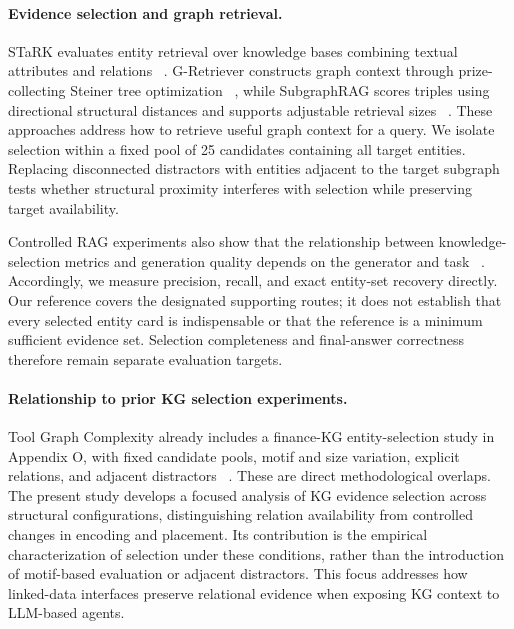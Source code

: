 \paragraph{Evidence selection and graph retrieval.}
STaRK evaluates entity retrieval over knowledge bases combining textual attributes and relations ~\cite{wu2024stark}. G-Retriever constructs graph context through prize-collecting Steiner tree optimization ~\cite{he2024gretriever}, while SubgraphRAG scores triples using directional structural distances and supports adjustable retrieval sizes ~\cite{li2025subgraphrag}. These approaches address how to retrieve useful graph context for a query. We isolate selection within a fixed pool of 25 candidates containing all target entities. Replacing disconnected distractors with entities adjacent to the target subgraph tests whether structural proximity interferes with selection while preserving target availability.

Controlled RAG experiments also show that the relationship between knowledge-selection metrics and generation quality depends on the generator and task ~\cite{li2025selection}. Accordingly, we measure precision, recall, and exact entity-set recovery directly. Our reference covers the designated supporting routes; it does not establish that every selected entity card is indispensable or that the reference is a minimum sufficient evidence set. Selection completeness and final-answer correctness therefore remain separate evaluation targets.

\paragraph{Relationship to prior KG selection experiments.}
Tool Graph Complexity already includes a finance-KG entity-selection study in Appendix O, with fixed candidate pools, motif and size variation, explicit relations, and adjacent distractors ~\cite{anonymousToolGraph}. These are direct methodological overlaps. The present study develops a focused analysis of KG evidence selection across structural configurations, distinguishing relation availability from controlled changes in encoding and placement. Its contribution is the empirical characterization of selection under these conditions, rather than the introduction of motif-based evaluation or adjacent distractors. This focus addresses how linked-data interfaces preserve relational evidence when exposing KG context to LLM-based agents.

